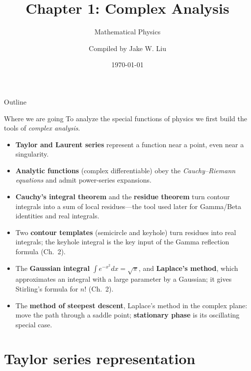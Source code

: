 \documentclass[11pt]{beamer}
\author[]{Compiled by Jake W. Liu}
\title[Complex Analysis]{Chapter 1: Complex Analysis}
\subtitle{Mathematical Physics}
\date{\today}
\begin{document}
\setcounter{sfchapter}{1}
\renewcommand{\thesection}{\arabic{sfchapter}.\arabic{section}}

\begin{frame}[c]\titlepage
\end{frame}

\begin{frame}{Outline}
\tableofcontents
\end{frame}

\begin{frame}{Where we are going}
\footnotesize
To analyze the special functions of physics we first build the tools of
\emph{complex analysis}.
\begin{itemize}
  \item \textbf{Taylor and Laurent series} represent a function near a point, even
        near a singularity.
  \item \textbf{Analytic functions} (complex differentiable) obey the
        \emph{Cauchy--Riemann equations} and admit power-series expansions.
  \item \textbf{Cauchy's integral theorem} and the \textbf{residue theorem} turn contour
        integrals into a sum of local residues---the tool used later for Gamma/Beta identities
        and real integrals.
  \item Two \textbf{contour templates} (semicircle and keyhole) turn residues into real
        integrals; the keyhole integral is the key input of the Gamma reflection formula (Ch.~2).
  \item The \textbf{Gaussian integral} \(\int e^{-x^2}dx=\sqrt\pi\), and \textbf{Laplace's method}, which
        approximates an integral with a large parameter by a Gaussian; it gives Stirling's formula for
        \(n!\) (Ch.~2).
  \item The \textbf{method of steepest descent}, Laplace's method in the complex plane: move the path
        through a saddle point; \textbf{stationary phase} is its oscillating special case.
\end{itemize}
\end{frame}

\section{Taylor series representation}
\end{document}
